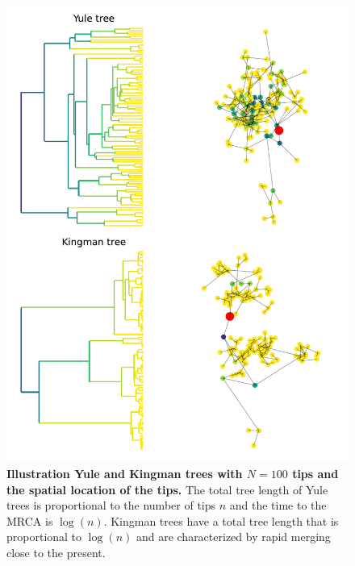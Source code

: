 \documentclass[aps,rmp, twocolumn]{revtex4}
\begin{document}
\begin{figure}[tb]
    \includegraphics*[width=\columnwidth]{figures/illustration_tree.pdf}
    \caption{\label{fig:illustration_tree}{\bf Illustration Yule and Kingman trees with $N=100$ tips and the spatial location of the tips.}
    The total tree length of Yule trees is proportional to the number of tips $n$ and the time to the MRCA is $\log(n)$.
    Kingman trees have a total tree length that is proportional to $\log(n)$ and are characterized by rapid merging close to the present. }
\end{figure}
\end{document}
